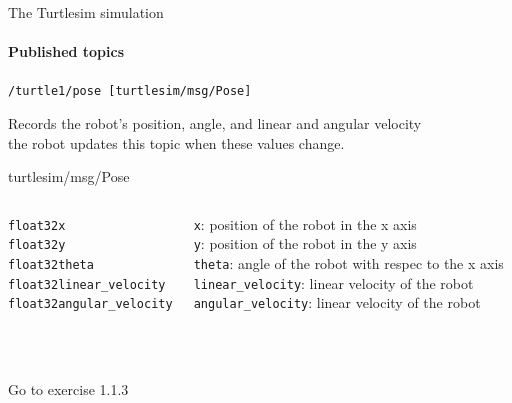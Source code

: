 \documentclass[compress]{beamer}
\begin{document}
\begin{frame}{The Turtlesim simulation}
\framesubtitle{{\bf Published topics}}
\footnotesize
 \texttt{/turtle1/pose [turtlesim/msg/Pose]}\\ \vspace{.5cm}
 
 Records the robot's position, angle, and linear and angular velocity\\
 {\tiny the robot updates this topic when these values change.}
 
 
 \vspace{.5cm}
 \begin{block}{{\tiny turtlesim/msg/Pose}}
 \begin{columns}
   
    
       \tiny
         \begin{alltt}
            float32 x\\
            float32 y\\
            float32 theta\\    
            float32 linear\_velocity \\
            float32 angular\_velocity\\
            \ \\
            \ \\ 
        \end{alltt}
     \tiny
     \texttt{x}: position of the robot in the x axis\\ \vspace{.1cm}
     \texttt{y}: position of the robot in the y axis\\ \vspace{.1cm}
     \texttt{theta}: angle of the robot with respec to the x axis\\ \vspace{.1cm}
     \texttt{linear\_velocity}: linear velocity of the robot\\ \vspace{.1cm}
     \texttt{angular\_velocity}: linear velocity of the robot
 \end{columns}
 \end{block}
 
 
 \vfill 
 
 {\tiny Go to exercise 1.1.3}  
 
 
\end{frame}
\end{document}
